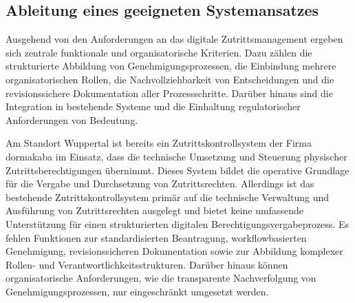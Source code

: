 \documentclass[
  12pt,
  a4paper,
  oneside,
  headings=normal,
  numbers=noendperiod
]{scrreprt}
\numberwithin{equation}{chapter}
\begin{document}
\subsection{Ableitung eines geeigneten Systemansatzes}

Ausgehend von den Anforderungen an das digitale Zutrittsmanagement ergeben sich
zentrale funktionale und organisatorische Kriterien. Dazu zählen die
strukturierte Abbildung von Genehmigungsprozessen, die Einbindung mehrere
organisatorischen Rollen, die Nachvollziehbarkeit von Entscheidungen und die
revisionssichere Dokumentation aller Prozessschritte. Darüber hinaus sind die
Integration in bestehende Systeme und die Einhaltung regulatorischer
Anforderungen von Bedeutung.

Am Standort Wuppertal ist bereits ein Zutrittskontrollsystem der Firma dormakaba
im Einsatz, dass die technische Umsetzung und Steuerung physischer
Zutrittsberechtigungen übernimmt. Dieses System bildet die operative Grundlage
für die Vergabe und Durchsetzung von Zutrittsrechten. Allerdings ist das
bestehende Zutrittskontrollsystem primär auf die technische Verwaltung und
Ausführung von Zutrittsrechten ausgelegt und bietet keine umfassende
Unterstützung für einen strukturierten digitalen
Berechtigungsvergabeprozess. Es fehlen Funktionen zur standardisierten
Beantragung, workflowbasierten Genehmigung, revisionssicheren Dokumentation
sowie zur Abbildung komplexer Rollen- und Verantwortlichkeitsstrukturen. Darüber
hinaus können organisatorische Anforderungen, wie die transparente
Nachverfolgung von Genehmigungsprozessen, nur eingeschränkt umgesetzt werden.

\label{LastNumberedPage}
\end{document}
